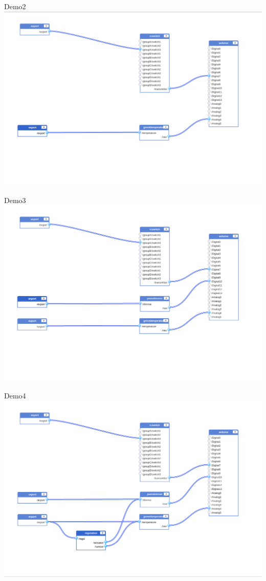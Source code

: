 \documentclass{beamer}
\begin{document}
\begin{frame}{Demo2}
\includegraphics[width=\columnwidth]{figures/config2.png}
\end{frame}

\begin{frame}{Demo3}
\includegraphics[width=\columnwidth]{figures/config3.png}
\end{frame}

\begin{frame}{Demo4}
\includegraphics[width=\columnwidth]{figures/config4.png}

\end{frame}
\end{document}
